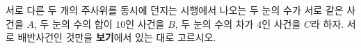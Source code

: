 서로 다른 두 개의 주사위를 동시에 던지는 시행에서 나오는 두 눈의 수가 서로 같은 사건을 $A$, 두 눈의 수의 합이 $10$인 사건을 $B$, 두 눈의 수의 차가 $4$인 사건을 $C$라 하자. 서로 배반사건인 것만을 \textbf{보기}에서 있는 대로 고르시오. 
